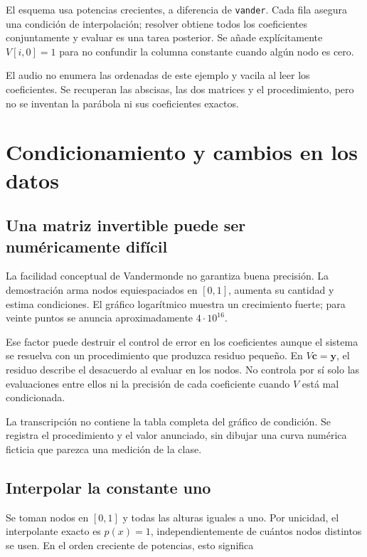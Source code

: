 \documentclass[12pt,a4paper]{article}
\begin{document}
El esquema usa potencias crecientes, a diferencia de \texttt{vander}. Cada fila asegura una condición de interpolación; resolver obtiene todos los coeficientes conjuntamente y evaluar es una tarea posterior. Se añade explícitamente $V[i,0]=1$ para no confundir la columna constante cuando algún nodo es cero.

\begin{notebox}
El audio no enumera las ordenadas de este ejemplo y vacila al leer los coeficientes. Se recuperan las abscisas, las dos matrices y el procedimiento, pero no se inventan la parábola ni sus coeficientes exactos.
\end{notebox}

\section{Condicionamiento y cambios en los datos}

\subsection{Una matriz invertible puede ser numéricamente difícil}

La facilidad conceptual de Vandermonde no garantiza buena precisión. La demostración arma nodos equiespaciados en $[0,1]$, aumenta su cantidad y estima condiciones. El gráfico logarítmico muestra un crecimiento fuerte; para veinte puntos se anuncia aproximadamente $4\cdot10^{16}$.

Ese factor puede destruir el control de error en los coeficientes aunque el sistema se resuelva con un procedimiento que produzca residuo pequeño. En $V\mathbf c=\mathbf y$, el residuo describe el desacuerdo al evaluar en los nodos. No controla por sí solo las evaluaciones entre ellos ni la precisión de cada coeficiente cuando $V$ está mal condicionada.

\begin{notebox}
La transcripción no contiene la tabla completa del gráfico de condición. Se registra el procedimiento y el valor anunciado, sin dibujar una curva numérica ficticia que parezca una medición de la clase.
\end{notebox}

\subsection{Interpolar la constante uno}

Se toman nodos en $[0,1]$ y todas las alturas iguales a uno. Por unicidad, el interpolante exacto es $p(x)=1$, independientemente de cuántos nodos distintos se usen. En el orden creciente de potencias, esto significa
\end{document}
